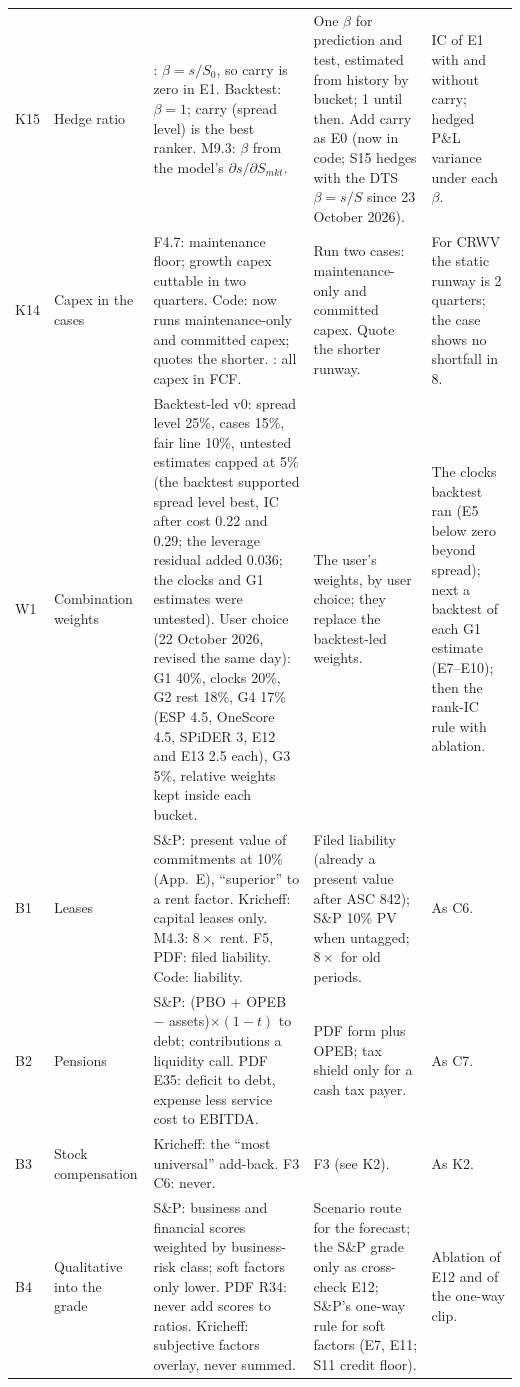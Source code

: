\documentclass[11pt]{article}
\begin{document}
{\begin{xltabular}{\linewidth}{@{}>{\raggedright\arraybackslash}p{9mm}>{\raggedright\arraybackslash}p{24mm}>{\raggedright\arraybackslash}X>{\raggedright\arraybackslash}p{38mm}>{\raggedright\arraybackslash}p{30mm}@{}}
K15 & Hedge ratio & : $\beta = s/S_0$, so carry is zero in E1. Backtest: $\beta=1$; carry (spread level) is the best ranker. M9.3: $\beta$ from the model's $\partial s/\partial S_{mkt}$. & One $\beta$ for prediction and test, estimated from history by bucket; 1 until then. Add carry as E0 (now in code; S15 hedges with the DTS $\beta = s/S$ since 23 October 2026). & IC of E1 with and without carry; hedged P\&L variance under each $\beta$. \\
K14 & Capex in the cases & F4.7: maintenance floor; growth capex cuttable in two quarters. Code: now runs maintenance-only and committed capex; quotes the shorter. : all capex in FCF. & Run two cases: maintenance-only and committed capex. Quote the shorter runway. & For CRWV the static runway is 2 quarters; the case shows no shortfall in 8. \\
\midrule
W1 & Combination weights & Backtest-led v0: spread level 25\%, cases 15\%, fair line 10\%, untested estimates capped at 5\% (the backtest supported spread level best, IC after cost 0.22 and 0.29; the leverage residual added 0.036; the clocks and G1 estimates were untested). User choice (22 October 2026, revised the same day): G1 40\%, clocks 20\%, G2 rest 18\%, G4 17\% (ESP 4.5, OneScore 4.5, SPiDER 3, E12 and E13 2.5 each), G3 5\%, relative weights kept inside each bucket. & The user's weights, by user choice; they replace the backtest-led weights. & The clocks backtest ran (E5 below zero beyond spread); next a backtest of each G1 estimate (E7--E10); then the rank-IC rule with ablation. \\
\midrule
B1 & Leases & S\&P: present value of commitments at 10\% (App.~E), ``superior'' to a rent factor. Kricheff: capital leases only. M4.3: $8\times$ rent. F5, PDF: filed liability. Code: liability. & Filed liability (already a present value after ASC 842); S\&P 10\% PV when untagged; $8\times$ for old periods. & As C6. \\
B2 & Pensions & S\&P: (PBO + OPEB $-$ assets)$\times(1-t)$ to debt; contributions a liquidity call. PDF E35: deficit to debt, expense less service cost to EBITDA. & PDF form plus OPEB; tax shield only for a cash tax payer. & As C7. \\
B3 & Stock compensation & Kricheff: the ``most universal'' add-back. F3 C6: never. & F3 (see K2). & As K2. \\
B4 & Qualitative into the grade & S\&P: business and financial scores weighted by business-risk class; soft factors only lower. PDF R34: never add scores to ratios. Kricheff: subjective factors overlay, never summed. & Scenario route for the forecast; the S\&P grade only as cross-check E12; S\&P's one-way rule for soft factors (E7, E11; S11 credit floor). & Ablation of E12 and of the one-way clip. \\

\end{xltabular}}
\end{document}

